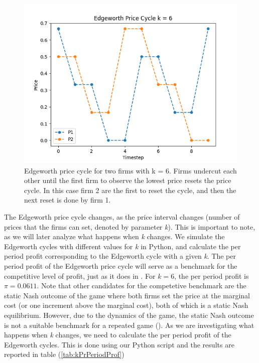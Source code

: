 \documentclass{article}
\begin{document}
\begin{figure}[H]
    \centering
    \includegraphics[scale = 0.75]{Edgeworth price cycle k = 6.png}
    \caption{Edgeworth price cycle for two firms with k = 6. Firms undercut each other until the first firm to observe the lowest price resets the price cycle. In this case firm 2 are the first to reset the cycle, and then the next reset is done by firm 1.}
    \label{fig:EdgeworthCycle}
\end{figure}
The Edgeworth price cycle changes, as the price interval changes (number of prices that the firms can set, denoted by parameter \textit{k}). This is important to note, as we will later analyze what happens when \textit{k} changes. 
\newline
We simulate the Edgeworth cycles with different values for \textit{k} in Python, and calculate the per period profit corresponding to the Edgeworth cycle with a given \textit{k}.
The per period profit of the Edgeworth price cycle will serve as a benchmark for the competitive level of profit, just as it does in \cite{Klein2021}. For $k = 6$, the per period profit is $\pi = 0.0611$. Note that other candidates for the competetive benchmark are the static Nash outcome of the game where both firms set the price at the marginal cost (or one increment above the marginal cost), both of which is a static Nash equilibrium. However, due to the dynamics of the game, the static Nash outcome is not a suitable benchmark for a repeated game (\cite{Klein2021}).
\newline
As we are investigating what happens when \textit{k} changes, we need to calculate the per period profit of the Edgeworth cycles. This is done using our Python script and the results are reported in table (\ref{tab:kPrPeriodProf})
\end{document}
